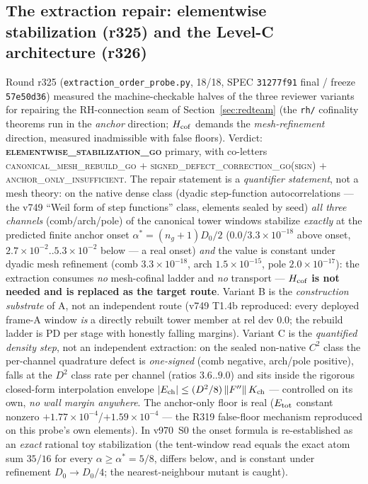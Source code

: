 \documentclass[11pt]{article}
\theoremstyle{definition}
\theoremstyle{remark}
\begin{document}
\subsection{The extraction repair: elementwise stabilization (r325)
and the Level-C architecture (r326)}\label{sec:elementwise-repair}

Round r325 (\texttt{extraction\_order\_probe.py}, 18/18, SPEC
\texttt{31277f91} final / freeze \texttt{57e50d36}) measured the
machine-checkable halves of the three reviewer variants for
repairing the RH-connection seam of Section~\ref{sec:redteam} (the
\texttt{rh/} cofinality theorems run in the \emph{anchor} direction;
$H_{\rm cof}$ demands the \emph{mesh-refinement} direction, measured
inadmissible with false floors).  Verdict:
\textbf{\textsc{elementwise\_stabilization\_go}} primary, with
co-letters \textsc{canonical\_mesh\_rebuild\_go} $+$
\textsc{signed\_defect\_correction\_go}(\textsc{sign}) $+$
\textsc{anchor\_only\_insufficient}.  The repair statement is a
\emph{quantifier statement}, not a mesh theory: on the native dense
class (dyadic step-function autocorrelations --- the v749 ``Weil
form of step functions'' class, elements sealed by seed)
\emph{all three channels} (comb/arch/pole) of the canonical tower
windows stabilize \emph{exactly} at the predicted finite anchor
onset $\alpha^* = (n_g + 1) D_0 / 2$ ($0.0$/$3.3\times10^{-18}$
above onset, $2.7\times10^{-2}$..$5.3\times10^{-2}$ below --- a real
onset) \emph{and} the value is constant under dyadic mesh refinement
(comb $3.3\times10^{-18}$, arch $1.5\times10^{-15}$, pole
$2.0\times10^{-17}$): the extraction consumes \emph{no} mesh-cofinal
ladder and \emph{no} transport --- $H_{\rm cof}$ \textbf{is not
needed and is replaced as the target route}.  Variant B is the
\emph{construction substrate} of A, not an independent route (v749
T1.4b reproduced: every deployed frame-A window \emph{is} a directly
rebuilt tower member at rel dev $0.0$; the rebuild ladder is PD per
stage with honestly falling margins).  Variant C is the
\emph{quantified density step}, not an independent extraction: on
the sealed non-native $C^2$ class the per-channel quadrature defect
is \emph{one-signed} (comb negative, arch/pole positive), falls at
the $D^2$ class rate per channel (ratios $3.6$..$9.0$) and sits
inside the rigorous closed-form interpolation envelope
$|E_{\rm ch}| \le (D^2/8)\,\lVert F''\rVert\, K_{\rm ch}$ ---
controlled on its own, \emph{no wall margin anywhere}.  The
anchor-only floor is real ($E_{\rm tot}$ constant nonzero
$+1.77\times10^{-4}$/$+1.59\times10^{-4}$ --- the R319 false-floor
mechanism reproduced on this probe's own elements).  In v970~S0 the
onset formula is re-established as an \emph{exact} rational toy
stabilization (the tent-window read equals the exact atom sum
$35/16$ for every $\alpha \ge \alpha^* = 5/8$, differs below, and is
constant under refinement $D_0 \to D_0/4$; the nearest-neighbour
mutant is caught).
\end{document}
